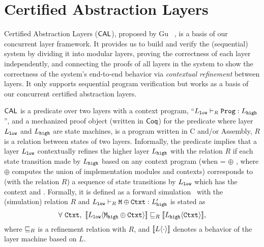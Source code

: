 \section{Certified Abstraction Layers}
\label{chapter:ccal:sec:cal}

Certified Abstraction Layers ($\mathsf{CAL}$), proposed by Gu \etal~\cite{deepspec}, is a basis of our concurrent layer framework.
It provides us to build and verify the (sequential) system by dividing it into modular layers, 
proving the correctness of each layer independently, and connecting the proofs of all layers in the system to show the correctness of the system's end-to-end behavior via \textit{contextual refinement} between layers. 
It only supports sequential program verification but works as a basis of our concurrent certified abstraction layers.

$\mathsf{CAL}$ is a predicate over two layers with a context program, 
``$L_{{\mathrm{\texttt{low}}}} \vdash_{R} {\mathrm{\texttt{Prog}}} : L_{{\mathrm{\texttt{high}}}}$'', 
and a mechanized proof object (written in $\mathsf{Coq}$) for the predicate where layer $L_{{\mathrm{\texttt{low}}}}$ and $L_{{\mathrm{\texttt{high}}}}$ are state machines,  is a program written in C and/or Assembly, $R$ is a relation between states of two layers.
Informally, the predicate implies that 
a layer $L_{{\mathrm{\texttt{low}}}}$ contextually refines the higher layer $L_{{\mathrm{\texttt{high}}}}$ with the relation $R$
 if each state transition made by $L_{{\mathrm{\texttt{high}}}}$ based on any context program  (when  =  $\oplus$ , where $\oplus$ computes the union of implementation modules and contexts) corresponds to (with the relation $R$)  a sequence of 
 state transitions by $L_{{\mathrm{\texttt{low}}}}$ which has the context  and  .
 Formally, it is defined as a forward simulation~\cite{Lynch95,leroy09,Milner71,Park81} with the (simulation) relation $R$
 and  $L_{{\mathrm{\texttt{low}}}} \vdash_{R} {\mathrm{\texttt{M}}} \oplus {\mathrm{\texttt{Ctxt}}} : L_{{\mathrm{\texttt{high}}}}'$ is stated as
$$\forall\ \codeinmath{Ctxt},\ \sem{L_{\codeinmath{low}}}{\codeinmath{M}_{\codeinmath{high}} \oplus \codeinmath{Ctxt}} \refines_{R} \sem{L_{\codeinmath{high}}}{\codeinmath{Ctxt}},$$
where $\sqsubseteq_{R}$ is a refinement relation with $R$, and $[\![{L} \langle {\cdot} \rangle]\!]$ denotes a  behavior of the layer machine based on $L$.


